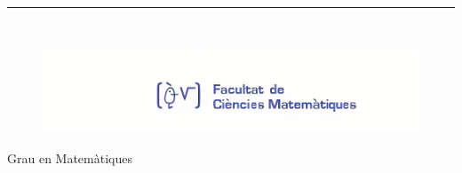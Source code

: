 \begin{titlepage}
\begin{center}
    \vspace*{0.5in}
    
    \rule{110mm}{0.1mm}\\
    
    
    \hspace{-3cm}
    \begin{minipage}[t]{.45\textwidth}
    \raggedleft
    \begin{figure}[H]
    
    \includegraphics[width=15cm]{LogoFac_upscaled.jpeg}
    \end{figure}
    \end{minipage}
    \hfill
    \noindent
    \begin{minipage}[t]{.45\textwidth}
    \raggedleft
    
    \vspace{2cm}
    \hspace{-1cm}
    \begin{Large}
    Grau en Matem\`atiques\\
    \end{Large}
    \end{minipage}
    \end{center}
    \end{titlepage}